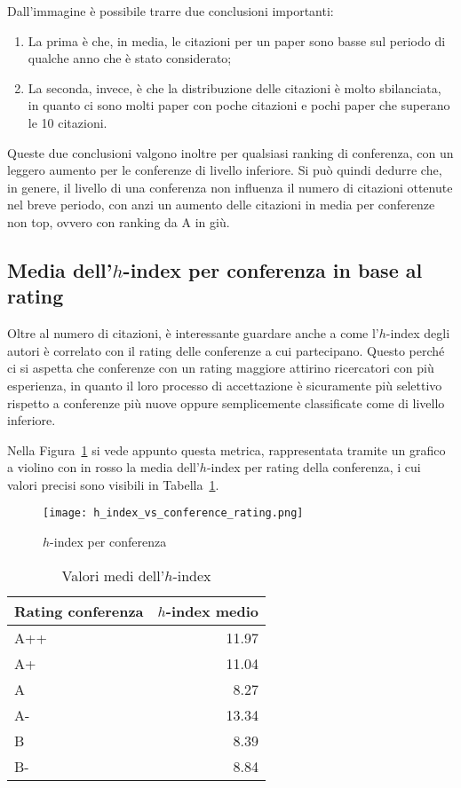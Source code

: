 Dall'immagine è possibile trarre due conclusioni importanti:
\begin{enumerate}
  \item La prima è che, in media, le citazioni per un paper sono basse sul
        periodo di qualche anno che è stato considerato;
  \item La seconda, invece, è che la distribuzione delle citazioni è molto sbilanciata,
        in quanto ci sono molti paper con poche citazioni e pochi paper che superano
        le 10 citazioni.
\end{enumerate}

Queste due conclusioni valgono inoltre per qualsiasi ranking di conferenza,
con un leggero aumento per le conferenze di livello inferiore.
Si può quindi dedurre che, in genere, il livello di una conferenza non influenza
il numero di citazioni ottenute nel breve periodo, con anzi
un aumento delle citazioni in media per conferenze non top, ovvero con ranking
da A in giù.

\subsection{Media dell'$h$-index per conferenza in base al rating}

Oltre al numero di citazioni, è interessante guardare anche
a come l'$h$-index degli autori è correlato con il rating delle conferenze
a cui partecipano. Questo perché ci si aspetta che conferenze con un rating
maggiore attirino ricercatori con più esperienza, in quanto il loro
processo di accettazione è sicuramente più selettivo rispetto a conferenze
più nuove oppure semplicemente classificate come di livello inferiore.

Nella Figura~\ref{fig:h-index-vs-rating} si vede appunto questa metrica,
rappresentata tramite un grafico a violino con in rosso la media dell'$h$-index
per rating della conferenza, i cui valori precisi sono visibili in
Tabella~\ref{table:h-index-vs-rating}.

\begin{figure}[tb]
  \centering
  \texttt{[image: h\_index\_vs\_conference\_rating.png]}
  \caption{$h$-index per conferenza}
  \label{fig:h-index-vs-rating}
\end{figure}

\begin{table}[tb]
  \centering
  \begin{tabular}{||l|r||}
    \hline
    \textbf{Rating conferenza} & \textbf{$h$-index medio} \\ [0.5ex] 
    \hline\hline
    A++    & 11.97 \\ \hline
    A+     & 11.04 \\ \hline
    A      & 8.27  \\ \hline
    A-     & 13.34 \\ \hline
    B      & 8.39 \\ \hline
    B-     & 8.84 \\ \hline
  \end{tabular}
  \caption{Valori medi dell'$h$-index}
  \label{table:h-index-vs-rating}
\end{table}

